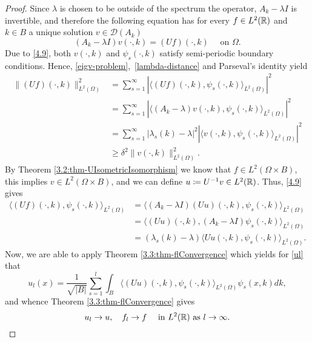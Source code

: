 \begin{theorem}
\begin{proof}
		Since $\lambda$ is chosen to be outside of the spectrum the operator, $A_{k} - \lambda I$ is invertible, and therefore the following equation has for every $f \in L^{2}(\mathbb{R})$ and $k \in B$ a unique solution $v \in \mathcal{D}(A_{k})$
		\begin{equation}
			(A_{k} - \lambda I) v(\cdot, k) = (Uf)(\cdot, k) \quad \text{ on } \Omega. \label{4.9}			
		\end{equation}
		Due to \eqref{4.9}, both $v(\cdot, k)$ and $\psi_{s}(\cdot, k)$ satisfy semi-periodic boundary conditions. Hence, \eqref{eigv-problem}, \eqref{lambda-distance} and Parseval's identity yield
		\begin{align*}
			\| (Uf)(\cdot, k)\|^{2}_{L^{2}(\Omega)} & = \sum_{s=1}^{\infty} |\langle (Uf)(\cdot, k), \psi_{s}(\cdot, k)\rangle_{L^{2}(\Omega)}|^{2} \\
			& = \sum_{s=1}^{\infty}|\langle (A_{k} - \lambda) v(\cdot, k), \psi_{s}(\cdot, k)\rangle_{L^{2}(\Omega)}|^{2} \\
			& = \sum_{s=1}^{\infty} |\lambda_{s}(k) - \lambda|^{2} |\langle v(\cdot, k), \psi_{s}(\cdot, k)\rangle_{L^{2}(\Omega)}|^{2} \\
			& \geq \delta^{2} \| v(\cdot, k)\|^{2}_{L^{2}(\Omega)}.
		\end{align*}
		By Theorem \ref{3.2:thm-UIsometricIsomorphism} we know that $f \in L^{2}(\Omega \times B)$, this implies $v \in L^{2}(\Omega \times B)$, and we can define $u \coloneqq U^{-1} v \in L^{2}(\mathbb{R})$. Thus, \eqref{4.9} gives
			\begin{align*}
				\langle (Uf)(\cdot, k), \psi_{s}(\cdot, k) \rangle_{L^{2}(\Omega)} & = \langle (A_{k} - \lambda I)(Uu)(\cdot, k), \psi_{s}(\cdot, k) \rangle_{L^{2}(\Omega)} \\
					& = \langle (Uu)(\cdot,k), (A_{k} - \lambda I) \psi_{s}(\cdot, k) \rangle_{L^{2}(\Omega)} \\
					& = (\lambda_{s}(k) - \lambda) \langle Uu(\cdot, k), \psi_{s}(\cdot, k) \rangle_{L^{2}(\Omega)}.
			\end{align*}
		Now, we are able to apply Theorem \ref{3.3:thm-flConvergence} which yields for \eqref{ul} that
			\[ u_{l}(x) = \frac{1}{\sqrt{|B|}} \sum_{s=1}^{l} \int_{B} \langle (Uu)(\cdot, k), \psi_{s}(\cdot, k)\rangle_{L^{2}(\Omega)} \psi_{s}(x, k) dk, \]
		and whence Theorem \ref{3.3:thm-flConvergence} gives
			\begin{equation}
				u_{l} \rightarrow u, \quad f_{l} \rightarrow f \quad \text{ in } L^{2}(\mathbb{R}) \text{ as } l \rightarrow \infty. \label{ulflconvergence}
			\end{equation}

\end{proof}
\end{theorem}
